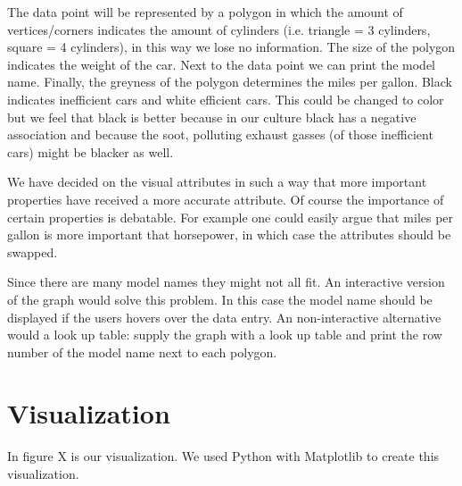 \documentclass{article}[10pt]
\begin{document}
The data point will be represented by a polygon in which the amount of
vertices/corners indicates the amount of cylinders (i.e. triangle = 3 cylinders,
square = 4 cylinders), in this way we lose no information. The size of the
polygon indicates the weight of the car.
Next to the data point we can print the model name.
Finally, the greyness of the polygon determines the miles per gallon. Black
indicates inefficient cars and white efficient cars. This could be changed to
color but we feel that black is better because in our culture black has a
negative association and because the soot, polluting exhaust gasses
(of those inefficient cars) might be blacker as well.

We have decided on the visual attributes in such a way that more important
properties have received a more accurate attribute. Of course the importance of
certain properties is debatable. For example one could easily argue that
miles per gallon is more important that horsepower, in which case the attributes
should be swapped.

Since there are many model names they might not all fit. An interactive version
of the graph would solve this problem. In this case the model name should be
displayed if the users hovers over the data entry. An non-interactive
alternative would a look up table: supply the graph with a look up table and
print the row number of the model name next to each polygon.

\section{Visualization}
In figure X is our visualization. We used Python with Matplotlib to create this
visualization.
\end{document}
